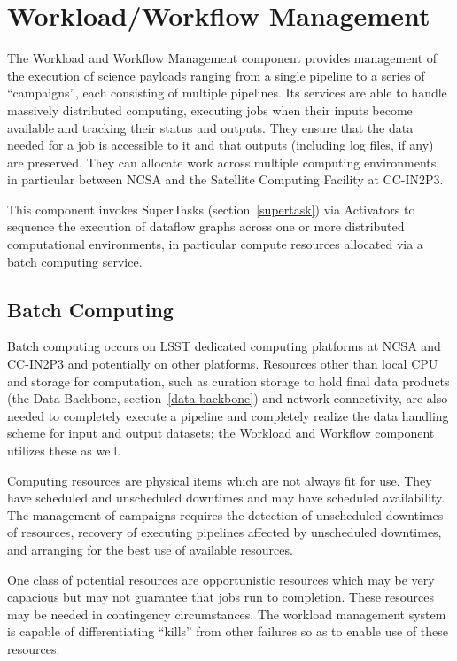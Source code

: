 \documentclass[DM,toc]{lsstdoc}
\begin{document}
\section{Workload/Workflow Management}\label{workload-workflow-management}

The Workload and Workflow Management component provides management of the
execution of science payloads ranging from a single pipeline to a series of
``campaigns'', each consisting of multiple pipelines. Its services are able to
handle massively distributed computing, executing jobs when their inputs become
available and tracking their status and outputs. They ensure that the data
needed for a job is accessible to it and that outputs (including log files, if
any) are preserved. They can allocate work across multiple computing
environments, in particular between NCSA and the Satellite Computing Facility
at CC-IN2P3.

This component invokes SuperTasks (section~\ref{supertask}) via Activators to
sequence the execution of dataflow graphs across one or more distributed
computational environments, in particular compute resources allocated via a
batch computing service.

\subsection{Batch Computing}\label{batch-computing}

Batch computing occurs on LSST dedicated computing platforms at NCSA and
CC-IN2P3 and potentially on other platforms. Resources other than local CPU and
storage for computation, such as curation storage to hold final data products
(the Data Backbone, section~\ref{data-backbone}) and network connectivity, are
also needed to completely execute a pipeline and completely realize the data
handling scheme for input and output datasets; the Workload and Workflow
component utilizes these as well.

Computing resources are physical items which are not always fit for use. They
have scheduled and unscheduled downtimes and may have scheduled availability.
The management of campaigns requires the detection of unscheduled downtimes of
resources, recovery of executing pipelines affected by unscheduled downtimes,
and arranging for the best use of available resources.

One class of potential resources are opportunistic resources which may be very
capacious but may not guarantee that jobs run to completion. These resources
may be needed in contingency circumstances. The workload management system is
capable of differentiating ``kills'' from other failures so as to enable use of
these resources.
\end{document}

